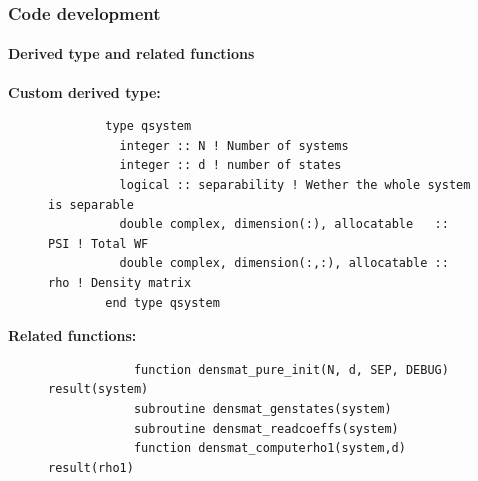 \documentclass[pt12]{beamer}
\begin{document}
\begin{frame}[fragile,label=Code development]
	\frametitle{Code development}
	\framesubtitle{Derived type and related functions}
	\tableofcontents[pausesections]
	\textbf{Custom derived type:}\vspace{-1cm}\\
	\begin{figure}[!h]\begin{verbatim}
		type qsystem
		  integer :: N ! Number of systems
		  integer :: d ! number of states
		  logical :: separability ! Wether the whole system is separable
		  double complex, dimension(:), allocatable   :: PSI ! Total WF
		  double complex, dimension(:,:), allocatable :: rho ! Density matrix
		end type qsystem
	\end{verbatim}
    \end{figure}
	\textbf{Related functions:}\vspace{-1cm}\\
	\begin{figure}[!h]\begin{verbatim}
			function densmat_pure_init(N, d, SEP, DEBUG) result(system)
			subroutine densmat_genstates(system)
			subroutine densmat_readcoeffs(system)
			function densmat_computerho1(system,d) result(rho1)
		\end{verbatim}
	\end{figure}
	
\end{frame}
\end{document}
